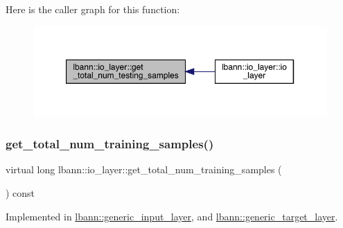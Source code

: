 Here is the caller graph for this function\+:\nopagebreak
\begin{figure}[H]
\begin{center}
\leavevmode
\includegraphics[width=350pt]{classlbann_1_1io__layer_a8c1575ad108ffbdf2a553a44509211e6_icgraph}
\end{center}
\end{figure}
\mbox{\label{classlbann_1_1io__layer_a744fe02208657194120714387b49cb28}} 
\subsubsection{\texorpdfstring{get\+\_\+total\+\_\+num\+\_\+training\+\_\+samples()}{get\_total\_num\_training\_samples()}}
{\footnotesize\ttfamily virtual long lbann\+::io\+\_\+layer\+::get\+\_\+total\+\_\+num\+\_\+training\+\_\+samples (\begin{DoxyParamCaption}{ }\end{DoxyParamCaption}) const\hspace{0.3cm}{\ttfamily [pure virtual]}}



Implemented in \hyperlink{classlbann_1_1generic__input__layer_a5fc757d16e26739cd10e5eabafa6a32b}{lbann\+::generic\+\_\+input\+\_\+layer}, and \hyperlink{classlbann_1_1generic__target__layer_a857306496e1c55cb15cd81301edb010f}{lbann\+::generic\+\_\+target\+\_\+layer}.

